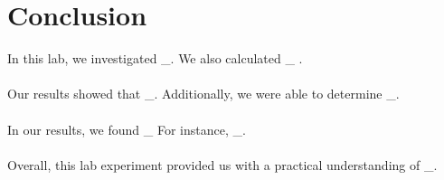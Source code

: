\documentclass[../Lab.tex]{subfiles}
\begin{document}
\section{Conclusion}

In this lab, we investigated \_. We also calculated \_  .\\
\\
Our results showed that \_. Additionally, we were able to determine \_.\\
\\
In our results, we found \_ For instance, \_.\\
\\
Overall, this lab experiment provided us with a practical understanding of \_.
\end{document}
